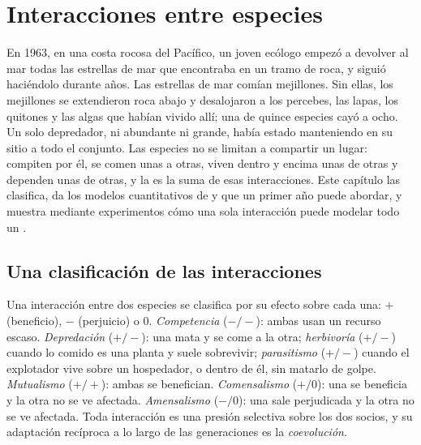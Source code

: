\chapter{Interacciones entre especies}\label{ch:b1:species-interactions}

En 1963, en una costa rocosa del Pacífico, un joven ecólogo empezó a
devolver al mar todas las estrellas de mar que encontraba en un tramo de
roca, y siguió haciéndolo durante años. Las estrellas de mar comían
mejillones. Sin ellas, los mejillones se extendieron roca abajo y desalojaron
a los percebes, las lapas, los quitones y las algas que habían vivido allí;
una  de quince especies cayó a ocho. Un solo depredador, ni
abundante ni grande, había estado manteniendo en su sitio a todo el
conjunto. Las especies no se limitan a compartir un lugar: compiten por él,
se comen unas a otras, viven dentro y encima unas de otras y dependen unas
de otras, y la  es la suma de esas interacciones. Este capítulo las
clasifica, da los modelos cuantitativos de  y  que un
primer año puede abordar, y muestra mediante experimentos cómo una sola
interacción puede modelar todo un .

\section{Una clasificación de las interacciones}

\begin{definition}\label{def:b1:species-interactions:types}
Una interacción entre dos especies se clasifica por su efecto sobre cada
una: $+$ (beneficio), $-$ (perjuicio) o $0$. \emph{Competencia} ($-/-$):
ambas usan un recurso escaso. \emph{Depredación} ($+/-$): una mata y se come
a la otra; \emph{herbivoría} ($+/-$) cuando lo comido es una planta y suele
sobrevivir; \emph{parasitismo} ($+/-$) cuando el explotador vive sobre un
hospedador, o dentro de él, sin matarlo de golpe. \emph{Mutualismo}
($+/+$): ambas se benefician. \emph{Comensalismo} ($+/0$): una se beneficia
y la otra no se ve afectada. \emph{Amensalismo} ($-/0$): una sale
perjudicada y la otra no se ve afectada. Toda interacción es una presión
selectiva sobre los dos socios, y su adaptación recíproca a lo largo de las
generaciones es la \emph{coevolución}.
\end{definition}

